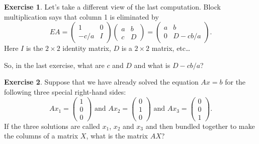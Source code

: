 \documentclass[11pt]{amsart}
\theoremstyle{definition}
\newtheorem{exercise}{Exercise}
\begin{document}
\begin{exercise} Let's take a different view of the last computation.
Block multiplication says that column 1 is eliminated by
\[
EA = \begin{pmatrix} 1 & 0 \\ -c/a & I \end{pmatrix}
\begin{pmatrix} a & b \\ c & D \end{pmatrix} =
\begin{pmatrix} a & b \\ 0 & D - cb/a \end{pmatrix}.
\]
Here $I$ is the $2\times 2$ identity matrix, $D$ is a $2\times 2$ matrix, etc\dots

So, in the last exercise, what are $c$ and $D$ and what is $D-cb/a$?
\end{exercise}

\begin{exercise}
Suppose that we have already solved the equation $Ax=b$ for the following three special right-hand sides:
\[
Ax_1 = \begin{pmatrix} 1 \\ 0 \\ 0 \end{pmatrix} \text{ and } Ax_2 = \begin{pmatrix} 0 \\ 1 \\ 0 \end{pmatrix} \text{ and } Ax_3 = \begin{pmatrix} 0 \\ 0 \\ 1 \end{pmatrix}.
\]
If the three solutions are called $x_1$, $x_2$ and $x_3$ and then bundled together to make the columns of a matrix $X$, what is the matrix $AX$?
\end{exercise}
\end{document}
